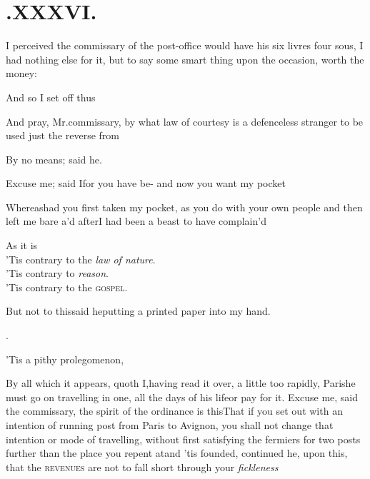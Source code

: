 \documentclass{article}
\begin{document}
\section{.\enspace XXXVI.}

 I perceived the commissary of the
post-office would have his six livres four sous, I had nothing else
for it, but to say some smart thing upon the occasion, worth the
money:

And so I set off thus\tsh{}

\tsh And pray, Mr.\@ commissary, by\break
what law of courtesy is a defenceless\break
stranger to be used just the reverse from\break
{}

By no means; said he.

Excuse me; said I\tsk for you have be-\break
{}\break
\tsk and now you want my pocket\tsh

Whereas\tsk had you first taken my pocket, as you do with your
own people\break
\tsk and then left me bare \hbox{a\tsk’d} after\tsk I had been a beast to have
complain’d\tsh

As it is\tsh\\
\tsh ’Tis contrary to the \textit{law of nature}.\\
\tsh ’Tis contrary to \textit{reason}.\\
\tsh ’Tis contrary to the \textsc{gospel}.

But not to this\tsh said he\tsk putting a printed
paper into my hand.\\
\centerline{.}
\etp{}
\newpage
\tsh\tsh ’Tis a pithy prolegomenon,
\break
\stick{\tsk \tsk \tsk \tsk \tsk \tsk \tsk \tsk \tsk \tsk \tsk \tsk}
\stick{\tsk \tsk \tsk \tsk \tsk \tsk \tsk \tsk \tsk \tsk \tsk \tsk}
\stick{\tsk \tsk \tsk \tsk \tsk \tsk \tsk \tsk \tsk \tsk \tsk \tsk}
\stick{\tsk \tsk \tsk \tsk \tsk \tsk \tsk \tsk \tsk \tsk \tsk \tsk}

\tsh By all which it appears, quoth I,\break having read it
over, a little too rapidly, 
Paris\tsk he must go on travelling in one, all the
days of his life\tsk or pay for it.\tsk\break
Excuse me, said the commissary, the spirit of the ordinance is
this\tsk That if you set out with an intention of running post
from Paris to Avignon, \etc you shall not change that intention
or mode of travelling, without first satisfying the fermiers for
two posts further than the place you repent at\tsk and ’tis
founded, conti\-nued he, upon this, that the \textsc{revenues} are
not to fall short through your \textit{fickleness}\tsh
\end{document}

